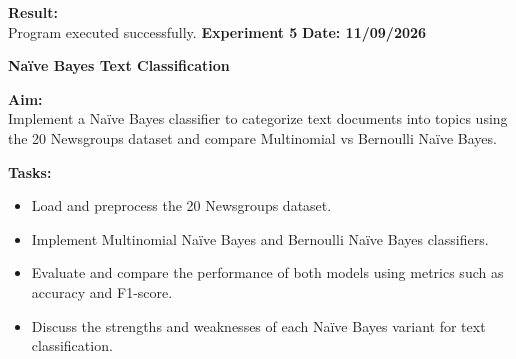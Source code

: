 \documentclass[12pt, a4paper]{article}
\begin{document}
\vspace{\baselineskip}

\noindent \textbf{Result:}\\
Program executed successfully.
\newpage
\noindent \textbf{Experiment 5} \hfill \textbf{Date: 11/09/2026}\\
\begin{center} \Large \textbf{Naïve Bayes Text Classification} \end{center}
\textbf{Aim:}\\
Implement a Naïve Bayes classifier to categorize text documents into topics using the 20 Newsgroups dataset and compare Multinomial vs Bernoulli Naïve Bayes.

\vspace{\baselineskip}
\noindent \textbf{Tasks:}\\
\vspace{-0.5\baselineskip}
\begin{itemize}[nosep]
    \item Load and preprocess the 20 Newsgroups dataset.
    \item Implement Multinomial Naïve Bayes and Bernoulli Naïve Bayes classifiers.
    \item Evaluate and compare the performance of both models using metrics such as accuracy and F1-score.
    \item Discuss the strengths and weaknesses of each Naïve Bayes variant for text classification.
\end{itemize}
\end{document}
